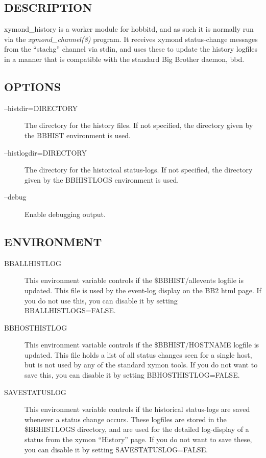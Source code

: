  
\subsection{DESCRIPTION}
 xymond\_history is a worker module for hobbitd, and as such it is
 normally run via the \emph{xymond\_channel(8)} program. It receives
 xymond status-change messages from the ``stachg'' channel via stdin,
 and uses these to update the history logfiles in a manner that is
 compatible with the standard Big Brother daemon, bbd. 


 
\subsection{OPTIONS}
\begin{description}
\item[--histdir=DIRECTORY] The directory for the history files. If not
  specified, the directory given by the BBHIST environment is used. 


 

\item[--histlogdir=DIRECTORY] The directory for the historical status-logs. If not specified, the directory given by the BBHISTLOGS environment is used. 

 

\item[--debug] Enable debugging output. 

 


\end{description}
\subsection{ENVIRONMENT}
\begin{description}
\item[BBALLHISTLOG] This environment variable controls if the
  \$BBHIST/allevents logfile is updated. This file is used by the
  event-log display on the BB2 html page. If you do not use this, you
  can disable it by setting BBALLHISTLOGS=FALSE. 


 

\item[BBHOSTHISTLOG] This environment variable controls if the
  \$BBHIST/HOSTNAME logfile is updated. This file holds a list of all
  status changes seen for a single host, but is not used by any of the
  standard xymon tools. If you do not want to save this, you can
  disable it by setting BBHOSTHISTLOG=FALSE. 


 

\item[SAVESTATUSLOG] This environment variable controls if the
  historical status-logs are saved whenever a status change
  occurs. These logfiles are stored in the \$BBHISTLOGS directory, and
  are used for the detailed log-display of a status from the xymon
  ``History'' page. If you do not want to save these, you can disable
  it by setting SAVESTATUSLOG=FALSE. 


 


\end{description}
